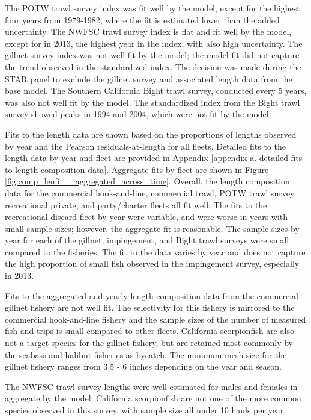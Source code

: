\documentclass[12pt,]{article}
\begin{document}
The POTW trawl survey index was fit well by the model, except for the
highest four years from 1979-1982, where the fit is estimated lower than
the added uncertainty. The NWFSC trawl survey index is flat and fit well
by the model, except for in 2013, the highest year in the index, with
also high uncertainty. The gillnet survey index was not well fit by the
model; the model fit did not capture the trend observed in the
standardized index. The decision was made during the STAR panel to
exclude the gillnet survey and associated length data from the base
model. The Southern California Bight trawl survey, conducted every 5
years, was also not well fit by the model. The standardized index from
the Bight trawl survey showed peaks in 1994 and 2004, which were not fit
by the model.

Fits to the length data are shown based on the proportions of lengths
observed by year and the Pearson residuals-at-length for all fleets.
Detailed fits to the length data by year and fleet are provided in
Appendix \ref{appendix-a.-detailed-fits-to-length-composition-data}.
Aggregate fits by fleet are shown in Figure
\ref{fig:comp_lenfit__aggregated_across_time}. Overall, the length
composition data for the commercial hook-and-line, commercial trawl,
POTW trawl survey, recreational private, and party/charter fleets all
fit well. The fits to the recreational discard fleet by year were
variable, and were worse in years with small sample sizes; however, the
aggregate fit is reasonable. The sample sizes by year for each of the
gillnet, impingement, and Bight trawl surveys were small compared to the
fisheries. The fit to the data varies by year and does not capture the
high proportion of small fish observed in the impingement survey,
especially in 2013.

Fits to the aggregated and yearly length composition data from the
commercial gillnet fishery are not well fit. The selectivity for this
fishery is mirrored to the commercial hook-and-line fishery and the
sample sizes of the number of measured fish and trips is small compared
to other fleets. California scorpionfish are also not a target species
for the gillnet fishery, but are retained most commonly by the seabass
and halibut fisheries as bycatch. The minimum mesh size for the gillnet
fishery ranges from 3.5 - 6 inches depending on the year and season.

The NWFSC trawl survey lengths were well estimated for males and females
in aggregate by the model. California scorpionfish are not one of the
more common species observed in this survey, with sample size all under
10 hauls per year.
\end{document}
